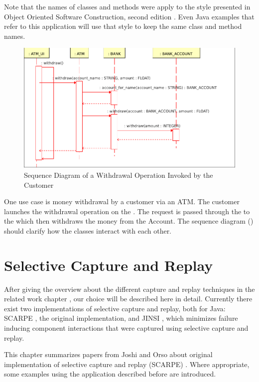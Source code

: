 Note that the names of classes and methods were apply to the style presented in Object Oriented Software Construction, second edition \cite{oosc2}. Even Java examples that refer to this application will use that style to keep the same class and method names.

\begin{figure}[ht]
   \centering
   \includegraphics[width=1\textwidth]{illustrations/example_withdrawal}
   \caption{Sequence Diagram of a Withdrawal Operation Invoked by the Customer}
   \label{fig:example_withdraw_sequence}
\end{figure}

One use case is money withdrawal by a customer via an ATM. The customer launches the withdrawal operation on the . The request is passed through the  to the  which then withdraws the money from the Account. The sequence diagram () should clarify how the classes interact with each other.



\section{Selective Capture and Replay}
After giving the overview about the different capture and replay techniques in the related work chapter	, our choice will be described here in detail. Currently there exist two implementations of selective capture and replay, both for Java: SCARPE \cite{orso05may, orso06}, the original implementation, and JINSI \cite{JINSI}, which minimizes failure inducing component interactions that were captured using selective capture and replay.

This chapter summarizes papers from Joshi and Orso about original implementation of selective capture and replay (SCARPE) \cite{orso05may, orso06}. Where appropriate, some examples using the application described before are introduced.

